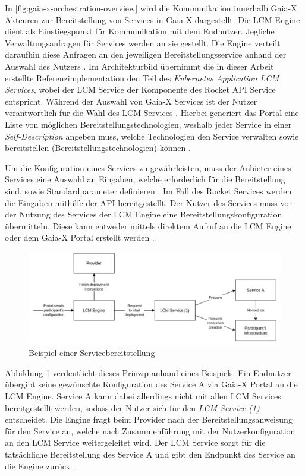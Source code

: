 In \ref{fig:gaia-x-orchestration-overview} wird die Kommunikation innerhalb Gaia-X Akteuren
zur Bereitstellung von Services in Gaia-X dargestellt.
Die \ac{LCM} Engine dient als Einstiegspunkt für Kommunikation mit dem Endnutzer. 
Jegliche Verwaltungsanfragen für Services werden an sie gestellt.
 Die Engine verteilt daraufhin diese Anfragen
an den jeweiligen Bereitstellungsservice anhand der Auswahl des Nutzers \cite{ORC2021}.
Im Architekturbild übernimmt die in dieser Arbeit erstellte Referenzimplementation
den Teil des \emph{Kubernetes Application LCM Services}, wobei der \ac{LCM} Service der
Komponente des Rocket API Service entspricht.
Während der Auswahl von Gaia-X Services ist der Nutzer verantwortlich für die Wahl des \ac{LCM} Services \cite{ORC2021}.
Hierbei generiert das Portal eine Liste von möglichen Bereitstellungstechnologien,
weshalb jeder Service in einer \emph{Self-Description} angeben muss, welche Technologien den Service
verwalten sowie bereitstellen (Bereitstellungstechnologien) können \cite{ORC2021}.

Um die Konfiguration eines Services zu gewährleisten, muss der Anbieter eines Services eine Auswahl
an Eingaben, welche erforderlich für die Bereitstellung sind, sowie Standardparameter definieren \cite{ORC2021}.
Im Fall des Rocket Services werden die Eingaben mithilfe der API bereitgestellt.
Der Nutzer des Services muss vor der Nutzung des Services der \ac{LCM} Engine eine Bereitstellungskonfiguration übermitteln.
Diese kann entweder mittels direktem Aufruf an die \ac{LCM} Engine oder dem Gaia-X Portal erstellt werden \cite{ORC2021}.

\begin{figure}[h]
  \centering
  \includegraphics[width=\textwidth]{gfx/chapters/4_gaia-X/example_deployment.png}
  \caption{Beispiel einer Servicebereitstellung}
  \label{fig:gaia-x-example_deployment}
\end{figure}
Abbildung \ref{fig:gaia-x-example_deployment} verdeutlicht dieses Prinzip anhand eines Beispiels.
Ein Endnutzer übergibt seine gewünschte Konfiguration des Service A via Gaia-X Portal an die \ac{LCM} Engine.
Service A kann dabei allerdings nicht mit allen LCM Services bereitgestellt werden,
sodass der Nutzer sich für den \emph{\ac{LCM} Service (1)} entscheidet.
Die Engine fragt beim Provider nach der Bereitstellungsanweisung für den Service an,
welche nach Zusammenführung mit der Nutzerkonfiguration an den \ac{LCM} Service weitergeleitet wird.
Der \ac{LCM} Service sorgt für die tatsächliche Bereitstellung des Service A
und gibt den Endpunkt des Service an die Engine zurück \cite{ORC2021}.



